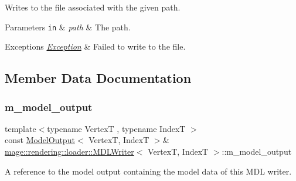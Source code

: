 Writes to the file associated with the given path.


\begin{DoxyParams}[1]{Parameters}
\mbox{\tt in}  & {\em path} & The path. \\
\hline
\end{DoxyParams}

\begin{DoxyExceptions}{Exceptions}
{\em \mbox{\hyperlink{classmage_1_1_exception}{Exception}}} & Failed to write to the file. \\
\hline
\end{DoxyExceptions}


\subsection{Member Data Documentation}
\mbox{\label{classmage_1_1rendering_1_1loader_1_1_m_d_l_writer_aefa6dfd7c4d7e2abe92e9c93b1e8638c}} 
\subsubsection{\texorpdfstring{m\+\_\+model\+\_\+output}{m\_model\_output}}
{\footnotesize\ttfamily template$<$typename VertexT , typename IndexT $>$ \\
const \mbox{\hyperlink{structmage_1_1rendering_1_1_model_output}{Model\+Output}}$<$ VertexT, IndexT $>$\& \mbox{\hyperlink{classmage_1_1rendering_1_1loader_1_1_m_d_l_writer}{mage\+::rendering\+::loader\+::\+M\+D\+L\+Writer}}$<$ VertexT, IndexT $>$\+::m\+\_\+model\+\_\+output\hspace{0.3cm}{\ttfamily [private]}}

A reference to the model output containing the model data of this M\+DL writer. 